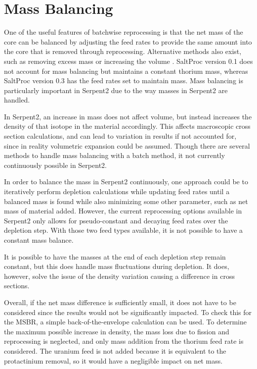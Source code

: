 \section{Mass Balancing}

One of the useful features of batchwise reprocessing is that the net mass of the core can be balanced by adjusting the feed rates to provide the same amount into the core that is removed through reprocessing. Alternative methods also exist, such as removing excess mass or increasing the volume \cite{ridley_method_2017}. SaltProc version 0.1 does not account for mass balancing but maintains a constant thorium mass, whereas SaltProc version 0.3 has the feed rates set to maintain mass. Mass balancing is particularly important in Serpent2 due to the way masses in Serpent2 are handled.

In Serpent2, an increase in mass does not affect volume, but instead increases the density of that isotope in the material accordingly. This affects macroscopic cross section calculations, and can lead to variation in results if not accounted for, since in reality volumetric expansion could be assumed. Though there are several methods to handle mass balancing with a batch method, it not currently continuously possible in Serpent2.

In order to balance the mass in Serpent2 continuously, one approach could be to iteratively perform depletion calculations while updating feed rates until a balanced mass is found while also minimizing some other parameter, such as net mass of material added. However, the current reprocessing options available in Serpent2 only allows for pseudo-constant and decaying feed rates over the depletion step. With those two feed types available, it is not possible to have a constant mass balance.

It is possible to have the masses at the end of each depletion step remain constant, but this does handle mass fluctuations during depletion. It does, however, solve the issue of the density variation causing a difference in cross sections.

Overall, if the net mass difference is sufficiently small, it does not have to be considered since the results would not be significantly impacted. To check this for the MSBR, a simple back-of-the-envelope calculation can be used. To determine the maximum possible increase in density, the mass loss due to fission and reprocessing is neglected, and only mass addition from the thorium feed rate is considered. The uranium feed is not added because it is equivalent to the protactinium removal, so it would have a negligible impact on net mass.

